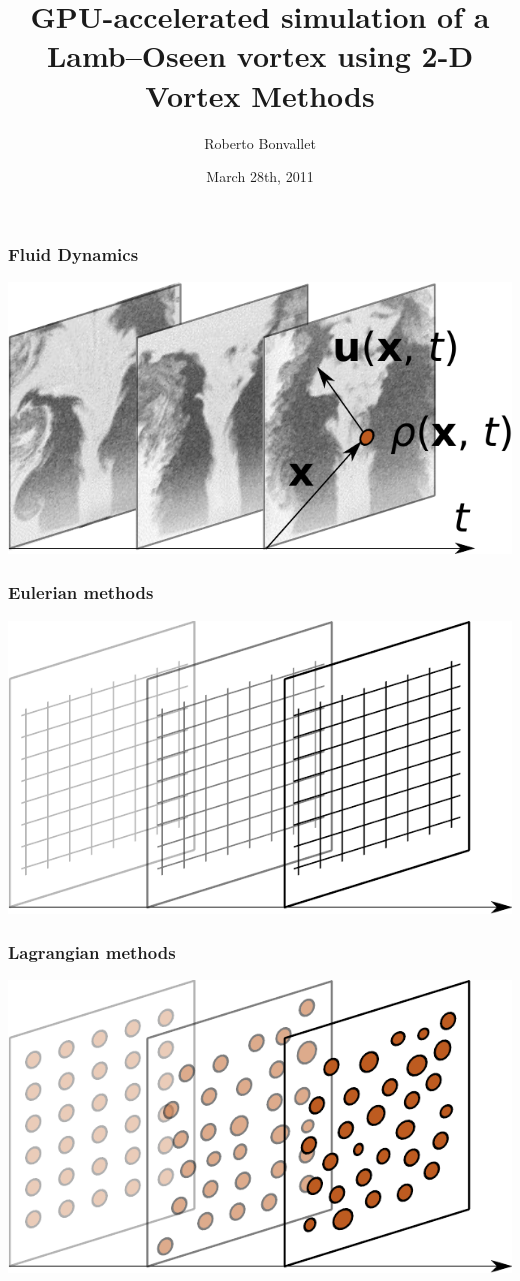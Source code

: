 \documentclass[12pt,english]{beamer}
\title{GPU-accelerated simulation of a Lamb--Oseen vortex
using 2-D Vortex Methods}
\author{Roberto Bonvallet}
\date{March 28th, 2011}
\begin{document}
  \begin{frame}
    \maketitle
  \end{frame}

  \begin{frame}
    \frametitle{Fluid Dynamics}
    \includegraphics{fluid1.pdf}
  \end{frame}

  \begin{frame}
    \frametitle{Eulerian methods}
    \includegraphics{fluid2.pdf}
  \end{frame}

  \begin{frame}
    \frametitle{Lagrangian methods}
    \includegraphics{fluid3.pdf}
  \end{frame}
\end{document}
